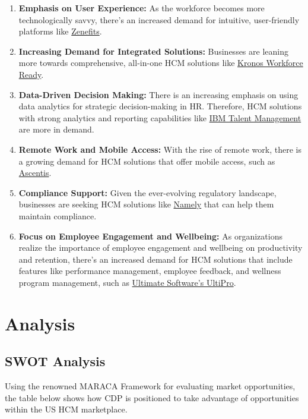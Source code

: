 \documentclass[
  a4paper,
]{book}
\renewcommand{\labelenumi}{\textbf{\textcolor{com-color}{\arabic*.}}}%
\begin{document}
\begin{enumerate}
\def\labelenumi{\arabic{enumi}.}
\item
  \textbf{Emphasis on User Experience:} As the workforce becomes more
  technologically savvy, there's an increased demand for intuitive,
  user-friendly platforms like
  \href{https://www.zenefits.com/}{Zenefits}.
\item
  \textbf{Increasing Demand for Integrated Solutions:} Businesses are
  leaning more towards comprehensive, all-in-one HCM solutions like
  \href{https://www.kronos.com/products/workforce-ready-suite}{Kronos
  Workforce Ready}.
\item
  \textbf{Data-Driven Decision Making:} There is an increasing emphasis
  on using data analytics for strategic decision-making in HR.
  Therefore, HCM solutions with strong analytics and reporting
  capabilities like \href{https://www.ibm.com/talent-management}{IBM
  Talent Management} are more in demand.
\item
  \textbf{Remote Work and Mobile Access:} With the rise of remote work,
  there is a growing demand for HCM solutions that offer mobile access,
  such as \href{https://www.ascentis.com/}{Ascentis}.
\item
  \textbf{Compliance Support:} Given the ever-evolving regulatory
  landscape, businesses are seeking HCM solutions like
  \href{https://www.namely.com/}{Namely} that can help them maintain
  compliance.
\item
  \textbf{Focus on Employee Engagement and Wellbeing:} As organizations
  realize the importance of employee engagement and wellbeing on
  productivity and retention, there's an increased demand for HCM
  solutions that include features like performance management, employee
  feedback, and wellness program management, such as
  \href{https://www.ultimatesoftware.com/UltiPro}{Ultimate Software's
  UltiPro}.
\end{enumerate}

\hypertarget{analysis}{%
\chapter{Analysis}\label{analysis}}

\hypertarget{swot-analysis}{%
\section{SWOT Analysis}\label{swot-analysis}}

Using the renowned MARACA Framework for evaluating market opportunities,
the table below shows how CDP is positioned to take advantage of
opportunities within the US HCM marketplace.
\end{document}
